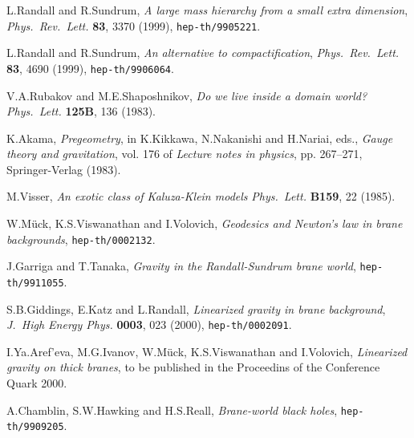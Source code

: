 \documentclass[letterpaper,12pt]{article}
\begin{document}
\begin{thebibliography}{99}

L.Randall and R.Sundrum, \emph{A large mass hierarchy from a small
extra dimension}, \emph{Phys.~Rev.~Lett.} \textbf{83}, 3370
(1999), \texttt{hep-th/9905221}.

L.Randall and R.Sundrum, \emph{An alternative to
compactification}, \emph{Phys.~Rev.~Lett.} \textbf{83}, 4690
(1999), \texttt{hep-th/9906064}.

V.A.Rubakov and M.E.Shaposhnikov, \emph{Do we live inside a domain
world?} \emph{Phys.~Lett.} \textbf{125B}, 136 (1983).

K.Akama, \emph{Pregeometry}, in K.Kikkawa, N.Nakanishi and
H.Nariai, eds., \emph{Gauge theory and gravitation}, vol. 176 of
\emph{Lecture notes in physics}, pp. 267--271, Springer-Verlag
(1983).

M.Visser, \emph{An exotic class  of Kaluza-Klein models}
\emph{Phys.~Lett.} \textbf{B159}, 22 (1985).


W.M{\"u}ck, K.S.Viswanathan and I.Volovich, \emph{Geodesics and
Newton's law in brane backgrounds}, \texttt{hep-th/0002132}.

J.Garriga and T.Tanaka, \emph{Gravity in the Randall-Sundrum brane
world},  \texttt{hep-th/9911055}.

S.B.Giddings, E.Katz and L.Randall, \emph{Linearized gravity in
brane background}, \emph{J.~High Energy Phys.} \textbf{0003}, 023
(2000), \texttt{hep-th/0002091}.

I.Ya.Aref'eva, M.G.Ivanov, W.M{\"u}ck, K.S.Viswanathan and
I.Volovich, \emph{Linearized gravity on thick branes}, to be
published  in the Proceedins of the Conference Quark 2000.

A.Chamblin, S.W.Hawking and H.S.Reall, \emph{Brane-world black
holes}, \texttt{hep-th/9909205}.

\end{thebibliography}
\end{document}
